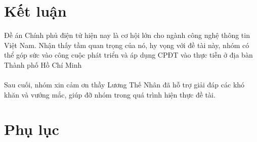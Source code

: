 \documentclass[a4paper]{article}
\begin{document}
\section{Kết luận}
Đề án Chính phủ điện tử hiện nay là cơ hội lớn cho ngành công nghệ thông tin Việt Nam. Nhận thấy tầm quan trọng của nó, hy vọng với đề tài này, nhóm có thể góp sức vào công cuộc phát triển và áp dụng CPĐT vào thực tiễn ở địa bàn Thành phố Hồ Chí Minh \\
\\
Sau cuối, nhóm xin cảm ơn thầy Lương Thế Nhân đã hỗ trợ giải đáp các khó khăn và vướng mắc, giúp đỡ nhóm trong quá trình hiện thực đề tài.

\newpage
\section{Phụ lục}
\end{document}
